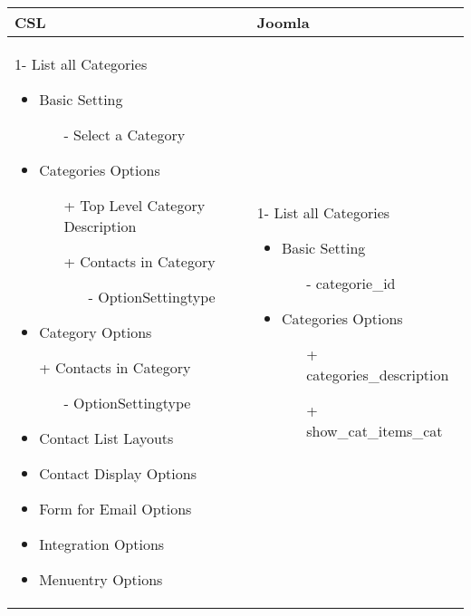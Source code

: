\begin{minipage}{0.7\textwidth}
\begin{tabular}{|p{} | p{}|}
\hline
\textbf{CSL} & \textbf{Joomla} \\ 
\hline
 1- List all Categories
   \begin{itemize}
     \item Basic  Setting 
    		\begin{enumerate}
    			\item[-] Select a Category
    		\end{enumerate}
    	\item Categories Options
 	   	\begin{enumerate}
 	    \item[+] Top Level Category Description
 	    \item[+] Contacts in Category 
 	    	  \begin{enumerate}
 	    			 \item[-] OptionSettingtype
 	    	\end{enumerate}
 	   \end{enumerate}
    	\item Category Options
    	\item[+] Contacts in Category 
    		    	  \begin{enumerate}
    		    			 \item[-] OptionSettingtype
    		    	\end{enumerate}
    	\item Contact List Layouts
 	\item Contact Display Options
 	\item Form for Email Options
 	\item Integration Options
 	\item Menuentry Options
  \end{itemize}
 & 
1- List all Categories
  \begin{itemize}
    \item Basic  Setting 
   		\begin{enumerate}
   			\item[-] categorie\_id
   		\end{enumerate}
   	\item Categories Options
	   	\begin{enumerate}
	    \item[+] categories\_description
	    \item[+] show\_cat\_items\_cat 
	    	  \begin{enumerate}

\end{enumerate}
\end{enumerate}
\end{itemize}
\end{tabular}
\end{minipage}
